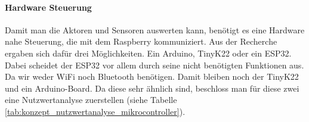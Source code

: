     \paragraph{Hardware Steuerung}
    Damit man die Aktoren und Sensoren auswerten kann, benötigt es eine Hardware nahe Steuerung, die mit dem Raspberry kommuniziert. Aus der Recherche ergaben sich dafür drei Möglichkeiten. Ein Arduino, TinyK22 oder ein ESP32. Dabei scheidet der ESP32 vor allem durch seine nicht benötigten Funktionen aus. Da wir weder WiFi noch Bluetooth benötigen. Damit bleiben noch der TinyK22 und ein Arduino-Board. Da diese sehr ähnlich sind, beschloss man für diese zwei eine Nutzwertanalyse zuerstellen (siehe Tabelle \ref{tab:konzept_nutzwertanalyse_mikrocontroller}).
        
    \begin{table}[H]
            \caption{Nutzwertanalyse der Mikrocontroller}
            \label{tab:konzept_nutzwertanalyse_mikrocontroller}
        \end{table}

